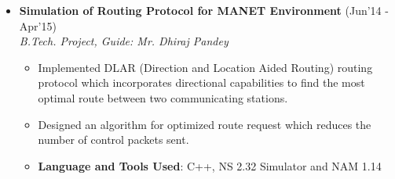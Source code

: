 \documentclass[a4paper,10pt]{article}
\newcommand{\sectsep}{-0.3cm}
\newcommand{\hsep}{-0.6cm}
\begin{document}
\begin{itemize}
          
          

\item \textbf{Simulation of Routing Protocol for MANET Environment} \hfill (Jun'14 - Apr'15) \\
    \emph{B.Tech. Project, Guide: Mr. Dhiraj Pandey } \\[\hsep]
        \begin{itemize}
            \item Implemented DLAR (Direction and Location Aided Routing) routing protocol which incorporates directional capabilities to find the most optimal route between two communicating stations. \\[\hsep]
            \item Designed an algorithm for optimized route request which reduces the number of control packets sent. \\[\hsep]
            \item \textbf{Language and Tools Used}: C++, NS 2.32 Simulator and NAM 1.14	\\[\sectsep]
            \end{itemize}
\end{itemize}		





\setlength{\tabcolsep}{3.5pt}
\renewcommand{\arraystretch}{1.3}
\end{document}
